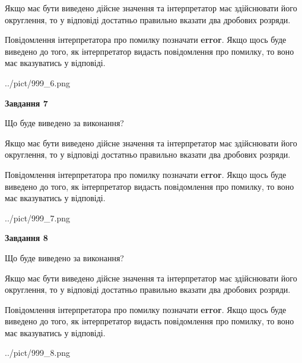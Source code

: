 \documentclass[12pt, ukrainian]{article}
\begin{document}
{\begin {Large}
Якщо має бути виведено дійсне значення та інтерпретатор має здійснювати його округлення, 
то у відповіді достатньо правильно вказати два дробових розряди.

Повідомлення інтерпретатора про помилку позначати \textbf{error}.
Якщо щось буде виведено до того, як інтерпретатор видасть повідомлення про помилку, 
то воно має вказуватись у відповіді. \par

\begin{center}
	{../pict/999_6.png}
\end{center}
\newpage

{\begin {center}\textbf{Завдання 7}\end {center}}\par
Що буде виведено за виконання? \par

Якщо має бути виведено дійсне значення та інтерпретатор має здійснювати його округлення, 
то у відповіді достатньо правильно вказати два дробових розряди.

Повідомлення інтерпретатора про помилку позначати \textbf{error}.
Якщо щось буде виведено до того, як інтерпретатор видасть повідомлення про помилку, 
то воно має вказуватись у відповіді. \par

\begin{center}
	{../pict/999_7.png}
\end{center}
\newpage

{\begin {center}\textbf{Завдання 8}\end {center}}\par
Що буде виведено за виконання? \par

Якщо має бути виведено дійсне значення та інтерпретатор має здійснювати його округлення, 
то у відповіді достатньо правильно вказати два дробових розряди.

Повідомлення інтерпретатора про помилку позначати \textbf{error}.
Якщо щось буде виведено до того, як інтерпретатор видасть повідомлення про помилку, 
то воно має вказуватись у відповіді. \par

\begin{center}
	{../pict/999_8.png}
\end{center}
\newpage


\end{Large}}
\end{document}
